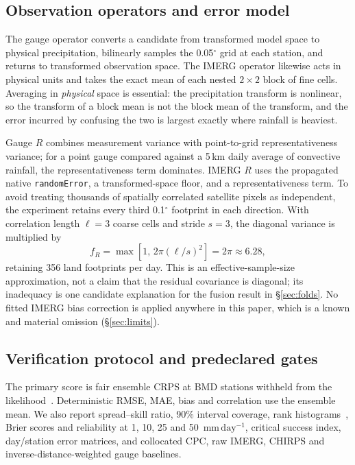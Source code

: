\documentclass[10pt,twocolumn]{article}
\newcommand{\mmday}{\mathrm{mm\,day^{-1}}}
\begin{document}
\subsection{Observation operators and error model}
\label{sec:operators}

The gauge operator converts a candidate from transformed model space to
physical precipitation, bilinearly samples the 0.05$^\circ$ grid at each
station, and returns to transformed observation space. The IMERG operator
likewise acts in physical units and takes the exact mean of each nested
$2\times2$ block of fine cells. Averaging in \emph{physical} space is
essential: the precipitation transform is nonlinear, so the transform of a
block mean is not the block mean of the transform, and the error incurred by
confusing the two is largest exactly where rainfall is heaviest.

Gauge $R$ combines measurement variance with point-to-grid representativeness
variance; for a point gauge compared against a 5\,km daily average of
convective rainfall, the representativeness term dominates. IMERG $R$ uses the
propagated native \texttt{randomError}, a transformed-space floor, and a
representativeness term. To avoid treating thousands of spatially correlated
satellite pixels as independent, the experiment retains every third
0.1$^\circ$ footprint in each direction. With correlation length $\ell=3$
coarse cells and stride $s=3$, the diagonal variance is multiplied by
\begin{equation}
 f_R=\max\!\left[1,\,2\pi(\ell/s)^2\right]=2\pi\approx6.28 ,
 \label{eq:rinflate}
\end{equation}
retaining 356 land footprints per day. This is an effective-sample-size
approximation, not a claim that the residual covariance is diagonal; its
inadequacy is one candidate explanation for the fusion result in
\S\ref{sec:folds}. No fitted IMERG bias correction is applied anywhere in this
paper, which is a known and material omission (\S\ref{sec:limits}).

\subsection{Verification protocol and predeclared gates}
\label{sec:gates}

The primary score is fair ensemble CRPS at BMD stations withheld from the
likelihood~\cite{gneiting2007,ferro2014}. Deterministic RMSE, MAE, bias and
correlation use the ensemble mean. We also report spread--skill ratio, 90\%
interval coverage, rank histograms~\cite{hamill2001}, Brier scores and
reliability at 1, 10, 25 and 50~$\mmday$, critical success index, day/station
error matrices, and collocated CPC, raw IMERG, CHIRPS and
inverse-distance-weighted gauge baselines.
\end{document}

